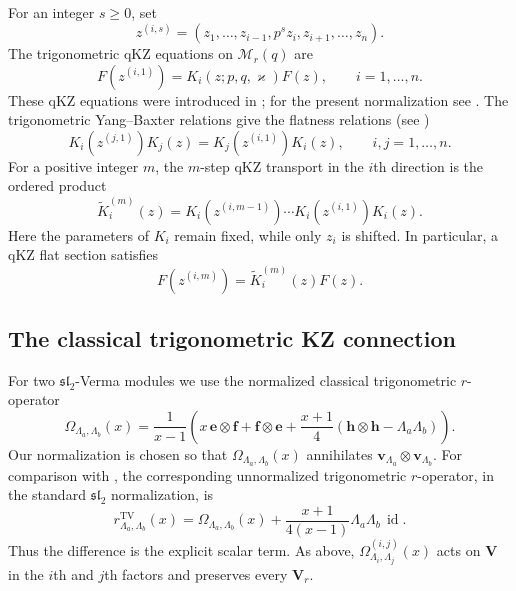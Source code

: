 \documentclass[12pt]{amsart}
\let\frak\mathfrak
\theoremstyle{definition}
\numberwithin{equation}{section}
\theoremstyle{definition}
\let\mc\mathcal
\let\La\Lambda
\let\Om\Omega
\let\ox\otimes
\let\ge\geqslant
\let\on\operatorname
\def\id{\on{id}}
\def\beq{\begin{equation}}
\def\eeq{\end{equation}}
\def\slt{{\frak{sl}_2}}
\begin{document}
For an integer $s\ge0$, set
\[
 z^{(i,s)}=(z_1,\ldots,z_{i-1},p^s z_i,z_{i+1},\ldots,z_n).
\]
The trigonometric qKZ equations on $\mc M_r(q)$ are
\beq\label{eq:qkz}
 F(z^{(i,1)})=K_i(z;p,q,\varkappa)F(z),
 \qquad i=1,\ldots,n.
\eeq
These qKZ equations were introduced in \cite{FR92}; for the
present normalization see \cite[Section~3]{TV97}.
The trigonometric Yang--Baxter relations give the flatness
relations (see \cite[Theorem~3.13]{TV97})
\[
 K_i(z^{(j,1)})K_j(z)=K_j(z^{(i,1)})K_i(z),
 \qquad i,j=1,\ldots,n.
\]
For a positive integer $m$, the $m$-step qKZ transport in the
$i$th direction is the ordered product
\beq\label{eq:mtransport}
 \widetilde K_i^{(m)}(z)
 =K_i(z^{(i,m-1)})\cdots K_i(z^{(i,1)})K_i(z).
\eeq
Here the parameters of $K_i$ remain fixed, while only $z_i$ is
shifted.  In particular, a qKZ flat section satisfies
\beq\label{eq:m-qkz}
 F(z^{(i,m)})=\widetilde K_i^{(m)}(z)F(z).
\eeq

\subsection{The classical trigonometric KZ connection}\label{sec:kz}

For two $\slt$-Verma modules we use the normalized
classical trigonometric $r$-operator
\beq\label{eq:Omega}
 \Om_{\La_a,\La_b}(x)
 =\frac{1}{x-1}\left(
   x\,\mathbf e\ox \mathbf f+\mathbf f\ox \mathbf e
   +\frac{x+1}{4}(\mathbf h\ox \mathbf h-\La_a\La_b)\right).
\eeq
Our normalization is chosen so that
$\Om_{\La_a,\La_b}(x)$ annihilates
$\mathbf v_{\La_a}\ox\mathbf v_{\La_b}$.  For comparison with
\cite[Sections~2.1--2.2]{TV00}, the corresponding unnormalized
trigonometric $r$-operator, in the standard $\slt$ normalization, is
\[
 r^{\mathrm{TV}}_{\La_a,\La_b}(x)
 =\Om_{\La_a,\La_b}(x)
 +\frac{x+1}{4(x-1)}\La_a\La_b\,\id.
\]
Thus the difference is the explicit scalar term.  As above,
$\Om^{(i,j)}_{\La_i,\La_j}(x)$ acts on $\mathbf V$ in the
$i$th and $j$th factors and preserves every $\mathbf V_r$.
\end{document}
